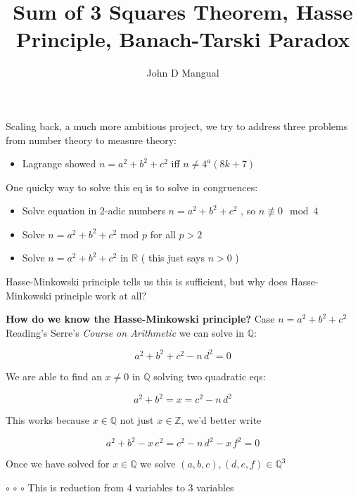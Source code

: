 \documentclass[12pt]{article}
\title{\textbf{ Sum of 3 Squares Theorem, Hasse Principle, Banach-Tarski Paradox }}
\author{John D Mangual}
\date{}
\begin{document}
\selectfont \fontsize{25}{30}\selectfont

\maketitle

Scaling back, a much more ambitious project, we try to address three problems from number theory to measure theory:

\begin{itemize}
\item Lagrange showed $n = a^2 + b^2 + c^2$ iff $n \neq 4^a (8k+7)$
\end{itemize}
One quicky way to solve this eq is to solve in congruences:
\begin{itemize}
\item Solve equation in 2-adic numbers $n = a^2 + b^2 + c^2$ , so $n \not \equiv 0 \mod 4$
\item Solve $n = a^2 + b^2 + c^2 \textrm{ mod } p$ for all $p > 2$
\item Solve $n = a^2 + b^2 + c^2$ in $\mathbb{R}$ ( this just says $n > 0$ )
\end{itemize}
Hasse-Minkowski principle tells us this is sufficient, but why does Hasse-Minkowski principle work at all?

\newpage

\noindent\textbf{How do we know the Hasse-Minkowski principle?  }
\newline \newline
Case $n = a^2 + b^2 + c^2$ 
\newline \newline
Reading's Serre's \textit{Course on Arithmetic} we can solve in $\mathbb{Q}$:

$$ a^2 + b^2 + c^2 - n \, d^2 = 0$$

\noindent We are able to find an $x \neq 0$ in $\mathbb{Q}$ solving two quadratic eqs:

$$ a^2 + b^2 = x = c^2 - n \, d^2 $$

\noindent This works because $x \in \mathbb{Q}$ not just $ x \in \mathbb{Z}$, we'd better write

$$ a^2 + b^2 - x\, e^2=  c^2 - n \, d^2 - x \, f^2 = 0$$

\noindent Once we have solved for $x \in \mathbb{Q}$ we solve $(a,b,c), (d,e,f) \in \mathbb{Q}^3 $ \newline

\noindent $\circ$ $\circ$ $\circ$ This is reduction from 4 variables to 3 variables  
\end{document}
